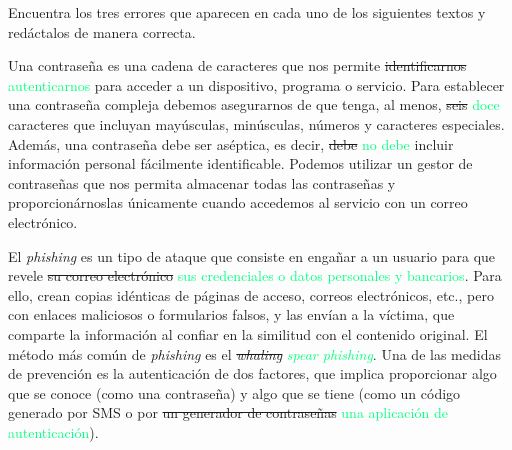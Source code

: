 \clearpage
{}
{

	Encuentra los tres errores que aparecen en cada uno de los siguientes textos y redáctalos de manera correcta.

}



\begin{solution}
	Una contraseña es una cadena de caracteres que nos permite \textcolor{samuraiRed}{\sout{identificarnos}} \textcolor{springGreen}{autenticarnos} para acceder a un dispositivo, programa o servicio. Para establecer una contraseña compleja debemos asegurarnos de que tenga, al menos, \textcolor{samuraiRed}{\sout{seis}} \textcolor{springGreen}{doce} caracteres que incluyan mayúsculas, minúsculas, números y caracteres especiales. Además, una contraseña debe ser aséptica, es decir, \textcolor{samuraiRed}{\sout{debe}} \textcolor{springGreen}{no debe} incluir información personal fácilmente identificable. Podemos utilizar un gestor de contraseñas que nos permita almacenar todas las contraseñas y proporcionárnoslas únicamente cuando accedemos al servicio con un correo electrónico.

	\vspace{2em}
	\hrulefill
	\vspace{2em}

	El \textit{phishing} es un tipo de ataque que consiste en engañar a un usuario para que revele \textcolor{samuraiRed}{\sout{su correo electrónico}} \textcolor{springGreen}{sus credenciales o datos personales y bancarios}. Para ello, crean copias idénticas de páginas de acceso, correos electrónicos, etc., pero con enlaces maliciosos o formularios falsos, y las envían a la víctima, que comparte la información al confiar en la similitud con el contenido original. El método más común de \textit{phishing} es el \textcolor{samuraiRed}{\sout{\textit{whaling}}} \textcolor{springGreen}{\textit{spear phishing}}. Una de las medidas de prevención es la autenticación de dos factores, que implica proporcionar algo que se conoce (como una contraseña) y algo que se tiene (como un código generado por SMS o por \textcolor{samuraiRed}{\sout{un generador de contraseñas}} \textcolor{springGreen}{una aplicación de autenticación}).

\end{solution}

